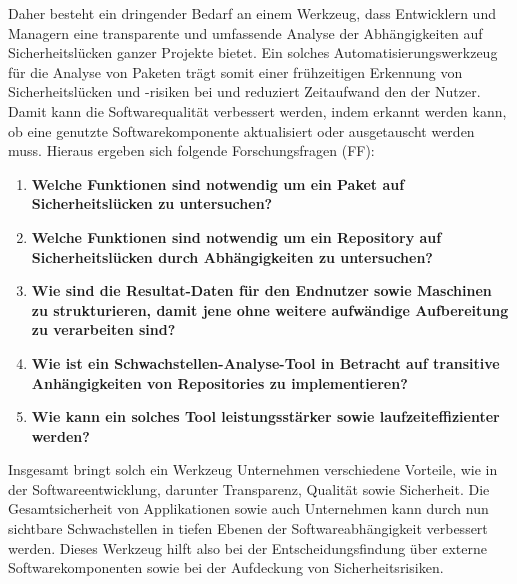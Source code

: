     Daher besteht ein dringender Bedarf an einem Werkzeug, dass Entwicklern und Managern eine transparente und umfassende Analyse der Abhängigkeiten auf Sicherheitslücken ganzer Projekte bietet.
    Ein solches Automatisierungswerkzeug für die Analyse von Paketen trägt somit einer frühzeitigen Erkennung von Sicherheitslücken und -risiken bei und reduziert Zeitaufwand den der Nutzer.
    Damit kann die Softwarequalität verbessert werden, indem erkannt werden kann, ob eine genutzte Softwarekomponente aktualisiert oder ausgetauscht werden muss.
    Hieraus ergeben sich folgende Forschungsfragen (FF):
    \begin{enumerate}[label=\textbf{FF-\Roman*}, leftmargin=1.75cm]
        \item \textbf{Welche Funktionen sind notwendig um ein Paket auf Sicherheitslücken zu untersuchen?}\label{q:one}
        \item \textbf{Welche Funktionen sind notwendig um ein Repository auf Sicherheitslücken durch Abhängigkeiten zu untersuchen?}\label{q:two}
        \item \textbf{Wie sind die Resultat-Daten für den Endnutzer sowie Maschinen zu strukturieren, damit jene ohne weitere aufwändige Aufbereitung zu verarbeiten sind?}\label{q:three}
        \item \textbf{Wie ist ein Schwachstellen-Analyse-Tool in Betracht auf transitive Anhängig\-keiten von Repositories zu implementieren?}\label{q:four}
        \item \textbf{Wie kann ein solches Tool leistungsstärker sowie laufzeiteffizienter werden?}\label{q:five}
    \end{enumerate}
    Insgesamt bringt solch ein Werkzeug Unternehmen verschiedene Vorteile, wie in der Softwareentwicklung, darunter Transparenz, Qualität sowie Sicherheit.
    Die Gesamtsicherheit von Applikationen sowie auch Unternehmen kann durch nun sichtbare Schwachstellen in tiefen Ebenen der Softwareabhängigkeit verbessert werden.
    Dieses Werkzeug hilft also bei der Entscheidungsfindung über externe Softwarekomponenten sowie bei der Aufdeckung von Sicherheitsrisiken.
    